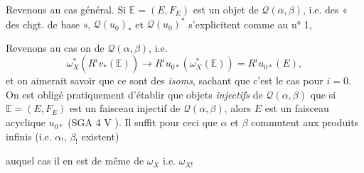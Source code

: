 \documentclass[11pt,a4paper]{article}
\begin{document}
Revenons au cas général. Si $\mathbb{E} = (E, F_E)$ est un objet de
$\mathcal{Q}(\alpha, \beta)$, i.e. des « \ill{} \ill{} des chgt. de base »,
$\mathcal{Q}(u_0)_*$ et $\mathcal{Q}(u_0)^{*}$ s'explicitent comme au n° 1,
\ill{} \struck{\ill{}} \ill{}

Revenons au cas \ill{} on \ill{} de $\mathcal{Q}(\alpha, \beta)$, i.e. \ill{}
\[
\omega_X^{*}(R^{i}v_*(\mathbb{E})) \longrightarrow R^{i}u_{0*}(\omega_X^{*}(\mathbb{E})) = R^{i}u_{0*}(E) ,
\]
et on aimerait savoir que ce sont des \emph{isoms}, sachant que c'est le
cas pour $i = 0$. On est obligé pratiquement d'établir que \ill{}
objets \emph{injectifs} de
$\mathcal{Q}(\alpha, \beta)$ \ill{} que \ill{} si $\mathbb{E} = (E, F_E)$ est
un faisceau injectif de $\mathcal{Q}(\alpha, \beta)$, alors $E$ est un
faisceau acyclique  $u_{0*}$ (SGA 4 V \ill{}). Il suffit pour ceci
que $\alpha$ et $\beta$ commutent aux produits infinis (i.e. $\alpha_!$,
$\beta_!$ existent)


auquel cas il en est de même de $\omega_X$ i.e. $\omega_{X!}$ \ill{}

\end{document}
